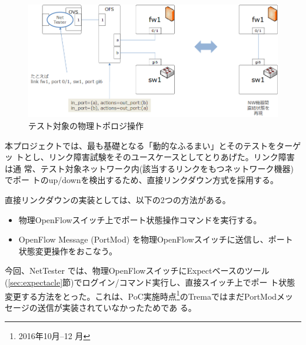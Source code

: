 \begin{figure}[h]
 \centering
 \includegraphics[scale=0.6]{img/patch-layer1.png}
 \caption{テスト対象の物理トポロジ操作}
 \label{fig:patch-layer1}
\end{figure}

本プロジェクトでは、最も基礎となる「動的なふるまい」とそのテストをターゲッ
トとし、リンク障害試験をそのユースケースとしてとりあげた。リンク障害は通
常、テスト対象ネットワーク内(該当するリンクをもつネットワーク機器)でポー
トのup/downを検出するため、直接リンクダウン方式を採用する。

直接リンクダウンの実装としては、以下の2つの方法がある。
\begin{itemize}
 \item 物理OpenFlowスイッチ上でポート状態操作コマンドを実行する。
 \item OpenFlow Message (PortMod) を物理OpenFlowスイッチに送信し、ポート
       状態変更操作をおこなう。
\end{itemize}
今回、NetTester では、物理OpenFlowスイッチにExpectベースのツール
(\ref{sec:expectacle}節)でログイン/コマンド実行し、直接スイッチ上でポー
ト状態変更する方法をとった。これは、PoC実施時点\footnote{2016年10月--12
月}のTremaではまだPortModメッセージの送信が実装されていなかったためであ
る。




